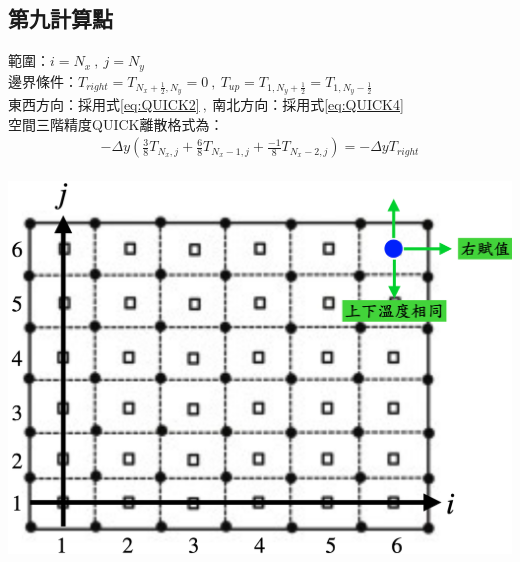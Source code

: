 \documentclass[12pt]{article}
\begin{document}
\subsection{第九計算點}
 \begin{minipage}{0.6\textwidth}
   \noindent 範圍：$i=N_{x}\ ,\ j=N_{y}$\\[1.5ex]
   \noindent 邊界條件：$T_{right} = T_{N_{x}+\frac{1}{2},N_{y}}= 0\ ,\ T_{up} = T_{1,N_{y}+\frac{1}{2}}=T_{1,N_{y}-\frac{1}{2}}$\\[1.5ex]
   \noindent 東西方向：採用式\eqref{eq:QUICK2}$\ ,\ $南北方向：採用式\eqref{eq:QUICK4}\\[1.5ex]
   \noindent 空間三階精度QUICK離散格式為：
   \begin{equation*}\begin{split}
   -\Delta y(\frac{3}{8}T_{N_{x},j} + \frac{6}{8}T_{N_{x}-1,j} + \frac{-1}{8}T_{N_{x}-2,j}) = -\Delta y T_{right} \\[1.5ex]
   \end{split}\end{equation*}
   \end{minipage}%
   \hfill
   \begin{minipage}{0.34\textwidth}
   \centering
   \includegraphics[width=\linewidth,height=9\baselineskip]{28.png}
   \label{fig:9th point}
\end{minipage}
\end{document}
